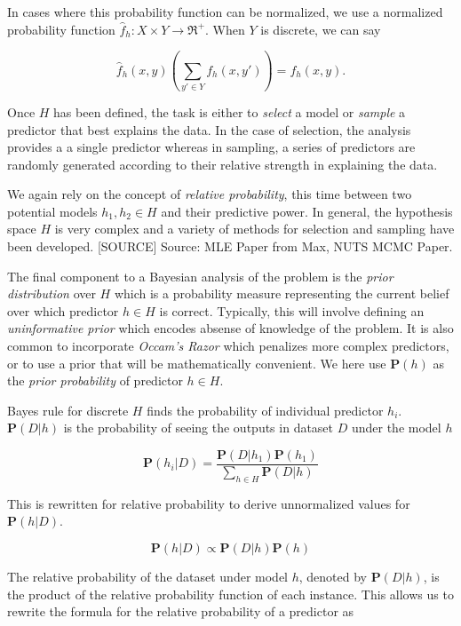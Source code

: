 \documentclass[twoside]{article}
\begin{document}
In cases where this probability function can be normalized, we use a normalized probability function \(\hat{f}_h: X \times Y \rightarrow \Re^+\). When \(Y\) is discrete, we can say

\begin{equation}
\label{eq:normalized_probability_model}
\hat{f}_h(x, y)\left(\sum_{y' \in Y} f_h(x,y')\right)=f_h(x, y).
\end{equation}

Once \(H\) has been defined, the task is either to \textit{select} a model or \textit{sample} a predictor that best explains the data. In the case of selection, the analysis provides a a single predictor whereas in sampling, a series of predictors are randomly generated according to their relative strength in explaining the data.

We again rely on the concept of \textit{relative probability}, this time between two potential models \(h_1, h_2 \in H\) and their predictive power. In general, the hypothesis space \(H\) is very complex and a variety of methods for selection and sampling have been developed. [SOURCE] Source: MLE Paper from Max, NUTS MCMC Paper.

The final component to a Bayesian analysis of the problem is the \textit{prior distribution} over \(H\) which is a probability measure representing the current belief over which predictor \(h \in H\) is correct. Typically, this will involve defining an \textit{uninformative prior} which encodes absense of knowledge of the problem. It is also common to incorporate \textit{Occam's Razor} which penalizes more complex predictors, or to use a prior that will be mathematically convenient. We here use \(\mathbf{P}(h)\) as the \textit{prior probability} of predictor \(h \in H\).

Bayes rule for discrete \(H\) finds the probability of individual predictor \(h_i\). \(\mathbf{P}(D|h)\) is the probability of seeing the outputs in dataset \(D\) under the model \(h\)

\[\mathbf{P}(h_i|D)=\frac{\mathbf{P}(D|h_1)\mathbf{P}(h_1)}{\sum_{h \in H}\mathbf{P}(D|h)}\]

This is rewritten for relative probability to derive unnormalized values for \(\mathbf{P}(h|D)\).

\begin{equation}
\label{eq:bayes}
\mathbf{P}(h|D)\propto\mathbf{P}(D|h)\mathbf{P}(h)
\end{equation}

The relative probability of the dataset under model \(h\), denoted by \(\mathbf{P}(D|h)\), is the product of the relative probability function of each instance. This allows us to rewrite the formula for the relative probability of a predictor as
\end{document}
